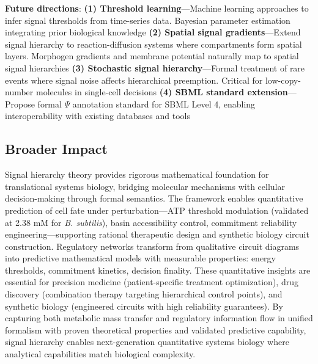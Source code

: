 \vspace{3pt}
\noindent\textbf{Future directions}: \textbf{(1) Threshold learning}---Machine learning approaches to infer signal thresholds from time-series data. Bayesian parameter estimation integrating prior biological knowledge \textbf{(2) Spatial signal gradients}---Extend signal hierarchy to reaction-diffusion systems where compartments form spatial layers. Morphogen gradients and membrane potential naturally map to spatial signal hierarchies \textbf{(3) Stochastic signal hierarchy}---Formal treatment of rare events where signal noise affects hierarchical preemption. Critical for low-copy-number molecules in single-cell decisions \textbf{(4) SBML standard extension}---Propose formal $\Psi$ annotation standard for SBML Level 4, enabling interoperability with existing databases and tools

\subsection{Broader Impact}

\vspace{3pt}
\noindent Signal hierarchy theory provides rigorous mathematical foundation for translational systems biology, bridging molecular mechanisms with cellular decision-making through formal semantics. The framework enables quantitative prediction of cell fate under perturbation---ATP threshold modulation (validated at 2.38 mM for \textit{B. subtilis}), basin accessibility control, commitment reliability engineering---supporting rational therapeutic design and synthetic biology circuit construction. Regulatory networks transform from qualitative circuit diagrams into predictive mathematical models with measurable properties: energy thresholds, commitment kinetics, decision finality. These quantitative insights are essential for precision medicine (patient-specific treatment optimization), drug discovery (combination therapy targeting hierarchical control points), and synthetic biology (engineered circuits with high reliability guarantees). By capturing both metabolic mass transfer and regulatory information flow in unified formalism with proven theoretical properties and validated predictive capability, signal hierarchy enables next-generation quantitative systems biology where analytical capabilities match biological complexity.
